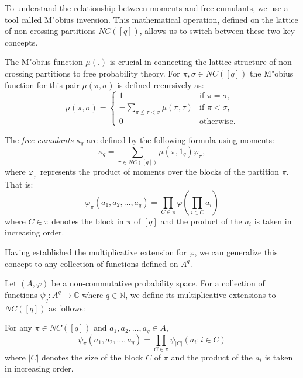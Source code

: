 To understand the relationship between moments and free cumulants, we use a tool called M"{o}bius inversion. This mathematical operation, defined on the lattice of non-crossing partitions $NC([q])$, allows us to switch between these two key concepts.

The M"{o}bius function $\mu(.)$ is crucial in connecting the lattice structure of non-crossing partitions to free probability theory. For $\pi, \sigma \in NC([q])$ the M"{o}bius function for this pair $\mu(\pi, \sigma)$ is defined recursively as:
\[
\mu(\pi, \sigma) = \begin{cases}
1 & \text{if } \pi = \sigma, \\
-\sum_{\pi \leq \tau < \sigma} \mu(\pi, \tau) & \text{if } \pi < \sigma, \\
0 & \text{otherwise}.
\end{cases}
\]

The \textit{free cumulants} $\kappa_q$ are defined by the following formula using moments:
\[
\kappa_q = \sum_{\pi \in NC([q])} \mu(\pi, 1_q) \varphi_\pi,
\]
where $\varphi_\pi$ represents the product of moments over the blocks of the partition $\pi$. That is:
\[
\varphi_{\pi} (a_1,a_2,\ldots,a_q)  = \prod_{C \in \pi} \varphi(\prod_{i \in C}a_i)
\]
where $C \in \pi$ denotes the block in $\pi$ of $[q]$ and the product of the $a_i$ is taken in increasing order.

Having established the multiplicative extension for $\varphi$, we can generalize this concept to any collection of functions defined on $A^q$.

\begin{definition}
Let $(A, \varphi)$ be a non-commutative probability space. For a collection of functions $\psi_q: A^q \to \mathbb{C}$ where $q\in \mathbb{N}$, we define its multiplicative extensions to $NC([q])$ as follows:

For any $\pi \in NC([q])$ and $a_1, a_2, \ldots, a_q \in A$,
\[
\psi_{\pi} (a_1,a_2,\ldots,a_q) = \prod_{C \in \pi} \psi_{|C|}(a_i : i \in C)
\]
where $|C|$ denotes the size of the block $C$ of $\pi$ and the product of the $a_i$ is taken in increasing order.
\end{definition}

